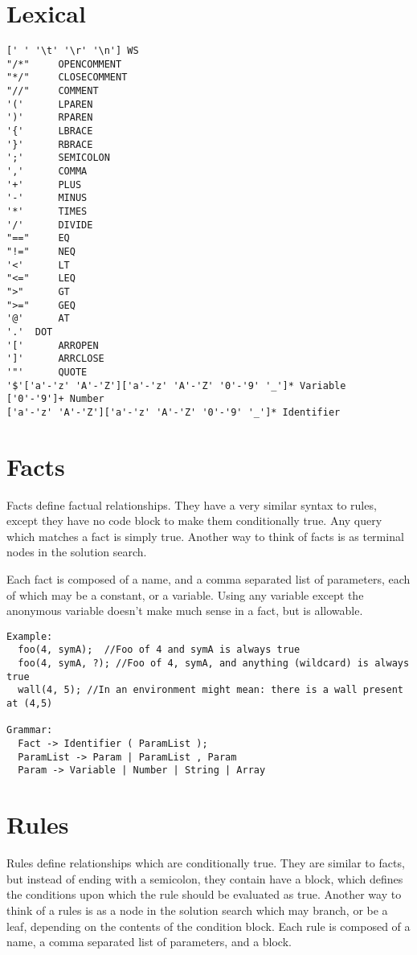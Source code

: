 \documentclass[onecolumn,titlepage]{article}
\begin{document}
\section{Lexical}
\begin{verbatim}
[' ' '\t' '\r' '\n'] WS
"/*"     OPENCOMMENT
"*/"     CLOSECOMMENT
"//"     COMMENT
'('      LPAREN
')'      RPAREN
'{'      LBRACE
'}'      RBRACE
';'      SEMICOLON
','      COMMA
'+'      PLUS
'-'      MINUS
'*'      TIMES
'/'      DIVIDE
"=="     EQ
"!="     NEQ
'<'      LT
"<="     LEQ
">"      GT
">="     GEQ
'@'      AT
'.'	 DOT
'['      ARROPEN
']'      ARRCLOSE
'"'      QUOTE
'$'['a'-'z' 'A'-'Z']['a'-'z' 'A'-'Z' '0'-'9' '_']* Variable
['0'-'9']+ Number
['a'-'z' 'A'-'Z']['a'-'z' 'A'-'Z' '0'-'9' '_']* Identifier
\end{verbatim}

\section{Facts}
Facts define factual relationships.  They have a very similar syntax to rules, except they
have no code block to make them conditionally true.  Any query which matches a fact is simply
true. Another way to think of facts is as terminal nodes in the solution search.

Each fact is composed of a name, and a comma separated list of parameters, each of which may
be a constant, or a variable.  Using any variable except the anonymous variable doesn't make
much sense in a fact, but is allowable.
\begin{verbatim}
Example:
  foo(4, symA);  //Foo of 4 and symA is always true
  foo(4, symA, ?); //Foo of 4, symA, and anything (wildcard) is always true
  wall(4, 5); //In an environment might mean: there is a wall present at (4,5)

Grammar:
  Fact -> Identifier ( ParamList );
  ParamList -> Param | ParamList , Param
  Param -> Variable | Number | String | Array
\end{verbatim}

\section{Rules}
Rules define relationships which are conditionally true.  They are similar to facts, but
instead of ending with a semicolon, they contain have a block, which defines the conditions
upon which the rule should be evaluated as true.  Another way to think of a rules is as
a node in the solution search which may branch, or be a leaf, depending on the contents
of the condition block. Each rule is composed of a name, a comma separated list of parameters,
and a block.
\end{document}
